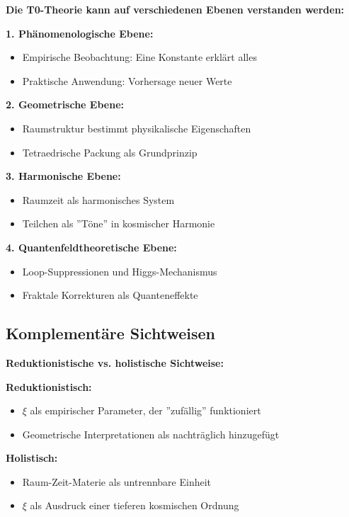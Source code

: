 	\begin{foundation}
		\textbf{Die T0-Theorie kann auf verschiedenen Ebenen verstanden werden:}
		
		\textbf{1. Phänomenologische Ebene:}
		\begin{itemize}
			\item Empirische Beobachtung: Eine Konstante erklärt alles
			\item Praktische Anwendung: Vorhersage neuer Werte
		\end{itemize}
		
		\textbf{2. Geometrische Ebene:}
		\begin{itemize}
			\item Raumstruktur bestimmt physikalische Eigenschaften
			\item Tetraedrische Packung als Grundprinzip
		\end{itemize}
		
		\textbf{3. Harmonische Ebene:}
		\begin{itemize}
			\item Raumzeit als harmonisches System
			\item Teilchen als ''Töne'' in kosmischer Harmonie
		\end{itemize}
		
		\textbf{4. Quantenfeldtheoretische Ebene:}
		\begin{itemize}
			\item Loop-Suppressionen und Higgs-Mechanismus
			\item Fraktale Korrekturen als Quanteneffekte
		\end{itemize}
	\end{foundation}
	
	\subsection{Komplementäre Sichtweisen}
	
	\begin{alternative}
		\textbf{Reduktionistische vs. holistische Sichtweise:}
		
		\textbf{Reduktionistisch:}
		\begin{itemize}
			\item $\xi$ als empirischer Parameter, der ''zufällig'' funktioniert
			\item Geometrische Interpretationen als nachträglich hinzugefügt
		\end{itemize}
		
		\textbf{Holistisch:}
		\begin{itemize}
			\item Raum-Zeit-Materie als untrennbare Einheit
			\item $\xi$ als Ausdruck einer tieferen kosmischen Ordnung
		\end{itemize}
	\end{alternative}
	
